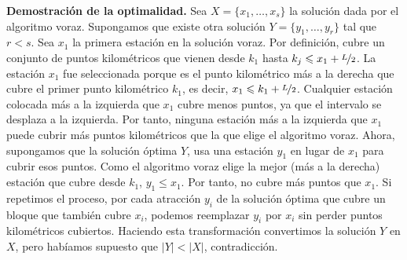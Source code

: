 \documentclass[12pt]{article}
\begin{document}
\begin{ejercicio}[2 puntos]
        \noindent
        \textbf{Demostración de la optimalidad.} Sea $X = \{x_1,\ldots,x_s\}$ la solución dada por el algoritmo voraz. Supongamos que existe otra solución $Y=\{y_1,\ldots,y_r\}$ tal que $r<s$. Sea $x_1$ la primera estación en la solución voraz. Por definición, cubre un conjunto de puntos kilométricos que vienen desde $k_1$ hasta $k_j \leq x_1 + \nicefrac{L}{2}$. La estación $x_1$ fue seleccionada porque es el punto kilométrico más a la derecha que cubre el primer punto kilométrico $k_1$, es decir, $x_1 \leq k_1 + \nicefrac{L}{2}$. Cualquier estación colocada más a la izquierda que $x_1$ cubre menos puntos, ya que el intervalo se desplaza a la izquierda. Por tanto, ninguna estación más a la izquierda que $x_1$ puede cubrir más puntos kilométricos que la que elige el algoritmo voraz. Ahora, supongamos que la solución óptima $Y$, usa una estación $y_1$ en lugar de $x_1$ para cubrir esos puntos. Como el algoritmo voraz elige la mejor (más a la derecha) estación que cubre desde $k_1$, $y_1 \leq x_1$. Por tanto, no cubre más puntos que $x_1$. Si repetimos el proceso, por cada atracción $y_i$ de la solución óptima que cubre un bloque que también cubre $x_i$, podemos reemplazar $y_i$ por $x_i$ sin perder puntos kilométricos cubiertos. Haciendo esta transformación convertimos la solución $Y$ en $X$, pero habíamos supuesto que $|Y| < |X|$, contradicción.
    \end{ejercicio}
\end{document}
